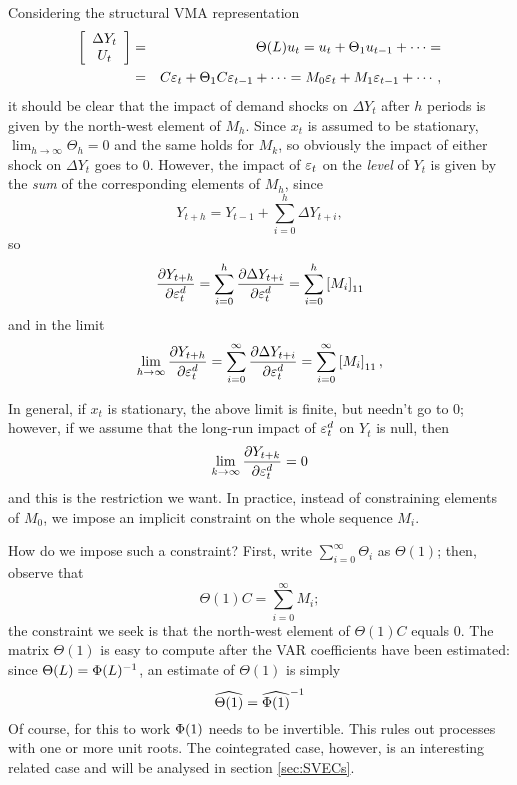 \documentclass[a4paper,10pt]{article}
\newcommand{\PrE}[1]{\ensuremath u_{#1}} %
\newcommand{\StS}[1]{\ensuremath \varepsilon_{#1}} %
\newcommand{\VarSym}{\ensuremath \Phi}
\newcommand{\pder}[2]{\ensuremath\frac{\partial #1}{\partial #2}}
\begin{document}
Considering the structural VMA representation
\begin{eqnarray*}
  \left[ \begin{array}{c} \Delta Y_t \\ U_t \end{array}\right] & = & 
  \Theta(L) \PrE{t} =
  \PrE{t} + \Theta_1 \PrE{t-1}  + \cdots = \\
  & = & C \StS{t} + \Theta_1 C \StS{t-1}  + \cdots =
  M_0 \StS{t} + M_1 \StS{t-1}  + \cdots ,
\end{eqnarray*}
it should be clear that the impact of demand shocks on $\Delta Y_t$
after $h$ periods is given by the north-west element of $M_h$. Since
$x_t$ is assumed to be stationary, $\lim_{h \to \infty} \Theta_h = 0$
and the same holds for $M_k$, so obviously the impact of either shock
on $\Delta Y_t$ goes to 0. However, the impact of $\StS{t}$ on the  %
\emph{level} of $Y_t$ is given by the \emph{sum} of the corresponding
elements of $M_h$, since
\[
Y_{t+h} = Y_{t-1} + \sum_{i=0}^h \Delta Y_{t+i}, 
\]
so 
\[
  \pder{Y_{t+h}}{\StS{t}^d} = 
  \sum_{i=0}^h \pder{\Delta Y_{t+i}}{\StS{t}^d} = 
  \sum_{i=0}^h \left[M_i\right]_{11}
\]
and in the limit
\[
\lim_{h \to \infty} \pder{Y_{t+h}}{\StS{t}^d} = \sum_{i=0}^{\infty}
\pder{\Delta Y_{t+i}}{\StS{t}^d}  = 
  \sum_{i=0}^{\infty} \left[M_i\right]_{11},
\]

In general, if $x_t$ is stationary, the above limit is finite, but
needn't go to 0; however, if we assume that the long-run impact of
$\StS{t}^d$ on $Y_t$ is null, then
\[
  \lim_{k \to \infty} \pder{Y_{t+k}}{\StS{t}^d} = 0
\]
and this is the restriction we want. In practice, instead of
constraining elements of $M_0$, we impose an implicit constraint on
the whole sequence $M_i$.

How do we impose such a constraint?  First, write $\sum_{i=0}^{\infty}
\Theta_i$ as $\Theta(1)$; then, observe that
\[
  \Theta(1) C = \sum_{i=0}^{\infty} M_i ;
\]
the constraint we seek is that the north-west element of $\Theta(1) C$
equals 0. The matrix $\Theta(1)$ is easy to compute after the VAR
coefficients have been estimated: since $\Theta(L) = \VarSym(L)^{-1}$, an
estimate of $\Theta(1)$ is simply
\[
  \widehat{\Theta(1)} = \widehat{\VarSym(1)}^{-1}
\]
Of course, for this to work $\VarSym(1)$ needs to be invertible. This rules
out processes with one or more unit roots. The cointegrated case,
however, is an interesting related case and will be analysed in section
\ref{sec:SVECs}.
\end{document}
